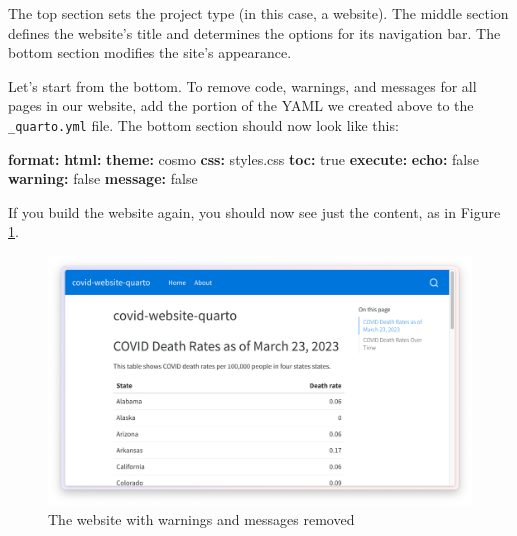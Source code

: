 \documentclass[
]{book}
\newenvironment{Shaded}{\begin{snugshade}}{\end{snugshade}}
\newcommand{\AttributeTok}[1]{\textcolor[rgb]{0.13,0.29,0.53}{#1}}
\newcommand{\CharTok}[1]{\textcolor[rgb]{0.31,0.60,0.02}{#1}}
\newcommand{\FunctionTok}[1]{\textcolor[rgb]{0.13,0.29,0.53}{\textbf{#1}}}
\newcommand{\KeywordTok}[1]{\textcolor[rgb]{0.13,0.29,0.53}{\textbf{#1}}}
\begin{document}
The top section sets the project type (in this case, a website). The middle section defines the website's title and determines the options for its navigation bar. The bottom section modifies the site's appearance.

Let's start from the bottom. To remove code, warnings, and messages for all pages in our website, add the portion of the YAML we created above to the \texttt{\_quarto.yml} file. The bottom section should now look like this:

\begin{Shaded}
\begin{Highlighting}[]
\FunctionTok{format}\KeywordTok{:}
\AttributeTok{  }\FunctionTok{html}\KeywordTok{:}
\AttributeTok{    }\FunctionTok{theme}\KeywordTok{:}\AttributeTok{ cosmo}
\AttributeTok{    }\FunctionTok{css}\KeywordTok{:}\AttributeTok{ styles.css}
\AttributeTok{    }\FunctionTok{toc}\KeywordTok{:}\AttributeTok{ }\CharTok{true}
\FunctionTok{execute}\KeywordTok{:}\AttributeTok{ }
\AttributeTok{  }\FunctionTok{echo}\KeywordTok{:}\AttributeTok{ }\CharTok{false}
\AttributeTok{  }\FunctionTok{warning}\KeywordTok{:}\AttributeTok{ }\CharTok{false}
\AttributeTok{  }\FunctionTok{message}\KeywordTok{:}\AttributeTok{ }\CharTok{false}
\end{Highlighting}
\end{Shaded}

If you build the website again, you should now see just the content, as in Figure \ref{fig:covid-website-no-messages}.

\begin{figure}
\includegraphics[width=1\linewidth]{assets/covid-website-no-messages} \caption{The website with warnings and messages removed}\label{fig:covid-website-no-messages}
\end{figure}
\end{document}
